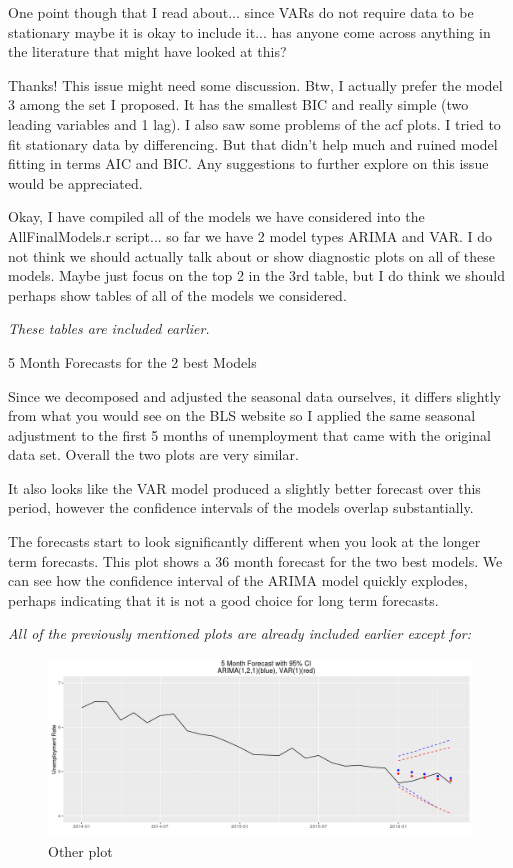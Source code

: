 \documentclass[twoside,twocolumn]{article}
\begin{document}
One point though that I read about... since VARs do not require data to be stationary maybe it is okay to include it... has anyone come across anything in the literature that might have looked at this?

Thanks! This issue might need some discussion. Btw, I actually prefer the model 3 among the set I proposed. It has the smallest BIC and really simple (two leading variables and 1 lag). I also saw some problems of the acf plots. I tried to fit stationary data by differencing. But that didn't help much and ruined model fitting in terms AIC and BIC. Any suggestions to further explore on this issue would be appreciated.

Okay, I have compiled all of the models we have considered into the AllFinalModels.r script... so far we have 2 model types ARIMA and VAR. I do not think we should actually talk about or show diagnostic plots on all of these models. Maybe just focus on the top 2 in the 3rd table, but I do think we should perhaps show tables of all of the models we considered.

\textit{These tables are included earlier.}

5 Month Forecasts for the 2 best Models

Since we decomposed and adjusted the seasonal data ourselves, it differs slightly from what you would see on the BLS website so I applied the same seasonal adjustment to the first 5 months of unemployment that came with the original data set. Overall the two plots are very similar.

It also looks like the VAR model produced a slightly better forecast over this period, however the confidence intervals of the models overlap substantially.

The forecasts start to look significantly different when you look at the longer term forecasts. This plot shows a 36 month forecast for the two best models. We can see how the confidence interval of the ARIMA model quickly explodes, perhaps indicating that it is not a good choice for long term forecasts.

\textit{All of the previously mentioned plots are already included earlier except for:}
    \begin{figure}[H]
    	\centering
     	\caption{Other plot}
     	\includegraphics[width=\linewidth]{images/arimavarforcastalso}
 \end{figure}
 
\end{document}
